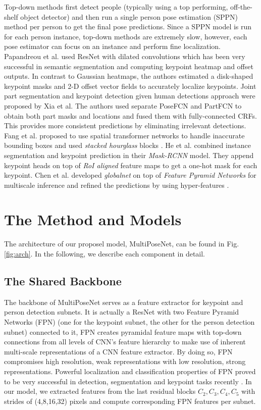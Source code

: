 \documentclass[runningheads]{llncs}
\begin{document}
Top-down methods first detect people (typically using a top performing, off-the-shelf object detector) and then run a single person pose estimation (SPPN) method per person to get the final pose predictions. Since a SPPN model is run for each person instance, top-down methods are extremely slow, however, each pose estimator can focus on an instance and perform fine localization. Papandreou et al.\cite{Papandreou2017} used ResNet with dilated convolutions \cite{He2016} which has been very successful in semantic segmentation \cite{Chen2016} and computing keypoint heatmap and offset outputs. In contrast to Gaussian heatmaps, the authors estimated a disk-shaped keypoint masks and 2-D offset vector fields to accurately localize keypoints. Joint part segmentation and keypoint detection given human detections approach were proposed by Xia et al.\cite{Xia} The authors used separate PoseFCN and PartFCN to obtain both part masks and locations and fused them with fully-connected CRFs. This provides more consistent predictions by eliminating irrelevant detections. Fang et al.\cite{Fang2017} proposed to use spatial transformer networks to handle inaccurate bounding boxes and used \textit{stacked hourglass} blocks \cite{Newella}. He et al.\cite{He2017a} combined instance segmentation and keypoint prediction in their \textit{Mask-RCNN} model. They append keypoint heads on top of \textit{RoI aligned} feature maps to get  a one-hot mask for each keypoint. Chen et al.\cite{Chen2017a} developed \textit{globalnet} on top of \textit{Feature Pyramid Networks} \cite{Lina} for multiscale inference and refined the predictions by using hyper-features \cite{Kong}.
\section{The Method and Models} 
The architecture of our proposel model, MultiPoseNet, can be found in Fig. \ref{fig:arch}. In the following, we describe each component in detail. 






\subsection{The Shared Backbone}
\label{sec:method-backbone}
The backbone of MultiPoseNet serves as  a feature extractor for keypoint and person detection subnets. It is actually a ResNet \cite{He2016} with two Feature Pyramid Networks (FPN)\cite{Lina} (one for the keypoint subnet, the other for the person detection subnet) connected to it, FPN creates pyramidal feature maps with top-down connections from all levels of CNN’s feature hierarchy to make use of inherent multi-scale representations of a CNN feature extractor. By doing so, FPN compromises high resolution, weak representations with low resolution, strong representations. Powerful localization and classification properties of FPN proved to be very successful in detection, segmentation and keypoint tasks recently \cite{Chen2017a, He2017a, Lin2017, Lina}. In our model, we extracted features from the last residual blocks $C_2, C_3, C_4, C_5$ with strides of (4,8,16,32) pixels and compute corresponding FPN features per subnet.
\end{document}
